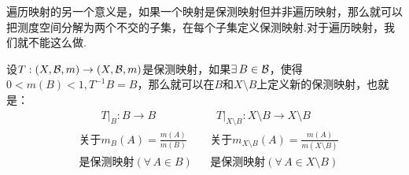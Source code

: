 遍历映射的另一个意义是，如果一个映射是保测映射但并非遍历映射，那么就可以把测度空间分解为两个不交的子集，在每个子集定义保测映射.对于遍历映射，我们就不能这么做.\par
设$T:(X,\mathcal{B},m)\to(X,\mathcal{B},m)$是保测映射，如果$\exists\, B\in\mathcal{B}$，使得$0<m(B)<1,T^{-1}B=B$，那么就可以在$B$和$X\setminus B$上定义新的保测映射，也就是：
{\setjot[-3]\begin{align*}
    &\qquad T|_B:B\to B  & &\;\; T|_{X\setminus B}:X\setminus B\to X\setminus B \\
    &\text{关于}m_B(A)=\frac{m(A)}{m(B)} & &\text{关于}m_{X\setminus B}(A)=\frac{m(A)}{m(X\setminus B)} \\
    &\text{是保测映射}(\forall\, A\in B) & &\text{是保测映射}(\forall\, A\in X\setminus B)
\end{align*}}

